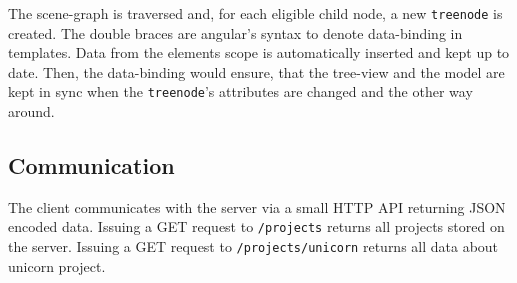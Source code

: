 The scene-graph is traversed and, for each eligible child node, a new
\texttt{treenode} is created. The double braces are angular's syntax
to denote data-binding in templates. Data from the elements scope is
automatically inserted and kept up to date. Then, the data-binding would
ensure, that the tree-view and the model are kept in sync when the
\texttt{treenode}'s attributes are changed and the other way around.

\subsection{Communication}
\label{interaction}

The client communicates with the server via a small HTTP API returning \gls{JSON} encoded data.
Issuing a GET request to \texttt{/projects} returns all projects stored on the server.
Issuing a GET request to \texttt{/projects/unicorn} returns all data about unicorn project.
